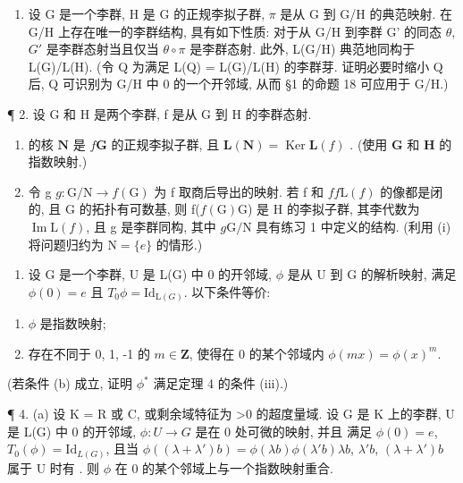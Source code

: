 
\begin{enumerate}
\def\labelenumi{\arabic{enumi}.}
\tightlist
\item
  设 G 是一个李群, H 是 G 的正规李拟子群, \(\pi\) 是从 G 到 G/H 的典范映射. 在 G/H 上存在唯一的李群结构, 具有如下性质: 对于从 G/H 到李群 G' 的同态 \(\theta\), \(G'\) 是李群态射当且仅当 \(\theta \circ \pi\) 是李群态射. 此外, L(G/H) 典范地同构于 L(G)/L(H). (令 Q 为满足 L(Q) = L(G)/L(H) 的李群芽. 证明必要时缩小 Q 后, Q 可识别为 G/H 中 0 的一个开邻域, 从而 §1 的命题 18 可应用于 G/H.)
\end{enumerate}

¶ 2. 设 G 和 H 是两个李群, f 是从 G 到 H 的李群态射.

\begin{enumerate}
\def\labelenumi{(\roman{enumi})}
\item
   的核 \(\mathbf{N}\) 是 \(f\)\(\mathbf{G}\) 的正规李拟子群, 且 \(\mathbf{L}(\mathbf{N}) = \operatorname{Ker} \mathbf{L}(f)\) . (使用 \(\mathbf{G}\) 和 \(\mathbf{H}\) 的指数映射.)
\item
  令 g \(g \colon \mathrm{G} / \mathrm{N} \to f(\mathrm{G})\) 为 f 取商后导出的映射. 若 f 和 \(f\)\(f\)\(\mathrm{L}(f)\) 的像都是闭的, 且 \(\mathrm{G}\) 的拓扑有可数基, 则 f(\(f(\mathrm{G})\)G) 是 \(\mathrm{H}\) 的李拟子群, 其李代数为 \(\operatorname{Im} \mathrm{L}(f)\), 且 g 是李群同构, 其中 \(g\)\(\mathrm{G} / \mathrm{N}\) 具有练习 1 中定义的结构. (利用 (i) 将问题归约为 \(\mathrm{N} = \{e\}\) 的情形.)
\end{enumerate}

\begin{enumerate}
\def\labelenumi{\arabic{enumi}.}
\setcounter{enumi}{2}
\tightlist
\item
  设 G 是一个李群, U 是 L(G) 中 0 的开邻域, \(\phi\) 是从 U 到 G 的解析映射, 满足 \(\phi(0) = e\) 且 \(T_{0}\phi = \mathrm{Id}_{\mathrm{L}(G)}\). 以下条件等价:
\end{enumerate}

\begin{enumerate}
\def\labelenumi{(\alph{enumi})}
\item
  \(\phi\) 是指数映射;
\item
  存在不同于 0, 1, -1 的 \(m \in \mathbf{Z}\), 使得在 0 的某个邻域内 \(\phi(mx) = \phi(x)^m\).
\end{enumerate}

(若条件 (b) 成立, 证明 \(\phi^{*}\) 满足定理 4 的条件 (iii).)

¶ 4. (a) 设 K = R 或 C, 或剩余域特征为 \textgreater0 的超度量域. 设 G 是 K 上的李群, U 是 L(G) 中 0 的开邻域, \(\phi: U \to G\) 是在 0 处可微的映射, 并且
满足 \(\phi(0) = e\), \(T_0(\phi) = \mathrm{Id}_{L(G)}\), 且当 \(\phi((\lambda + \lambda')b) = \phi(\lambda b)\phi(\lambda'b)\)\(\lambda b\), \(\lambda'b\), \((\lambda + \lambda')b\) 属于 U 时有 . 则 \(\phi\) 在 0 的某个邻域上与一个指数映射重合.


